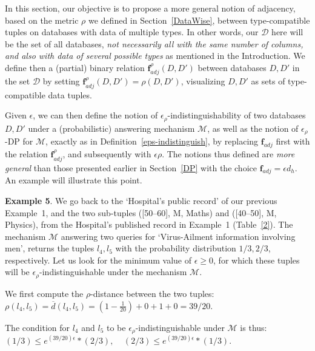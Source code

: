 \documentclass[pdflatex]{article}
\def \D {{\mathcal{D}}}
\def \M {{\mathcal{M}}}
\def \lft {\noindent}
\def \ovr {\overline}
\newcommand{\brho}{\mathbf{f}}
\begin{document}
  In this section, our objective is to propose a more general notion of adjacency,
  based  on  the  metric $\rho$ we defined in Section~\ref{DataWise}, between
  type-compatible tuples on databases   with   data of multiple types.
  In other words, our $\D$ here will be  the set of all   databases, {\em not necessarily
    all with the same number of columns, and also with data of   several possible types}
  as mentioned in the Introduction. We define then  a (partial) binary   relation
  $\brho^{\rho}_{adj}(D, D')$ between databases $D, D'$ in the set  $\D$ by 
  setting $ \brho^{\rho}_{adj}(D, D') = \rho(D, D')$, visualizing  $D, D'$  as  sets of
  type-compatible data tuples. 
 
  Given $\epsilon$, we can then define the notion of $\epsilon_{\rho}$-indistinguishability
  of   two  databases $D, D'$ under a (probabilistic) answering mechanism $\M$, as well as
  the  notion of $\epsilon_{\rho}$-DP for $\M$, exactly as in
  Definition~\ref{eps-indistinguish},
  by   replacing   $\brho_{adj}$ first with the relation $ \brho^{\rho}_{adj}$,  and
  subsequently with   $\epsilon\rho$. The notions thus defined are {\em more general} than 
  those presented   earlier in  Section~\ref{DP} with the choice  $\brho_{adj} = \epsilon  d_h$.
 An example will illustrate this point.  
  
  \vspace*{1mm}\lft
  {\bf Example 5}. We go back  to  the `Hospital's public record' of our  previous
  Example~1, and the two sub-tuples ([50--60], M, Maths) and   ([40--50], M, Physics),
  from  the Hospital's  published record in Example~1  (Table~\ref{2}). The  mechanism
  $\M$ answering two queries for `Virus-Ailment   information involving men', returns
  the tuples  $l_4, l_5$ with the  probability distribution $1/3, 2/3$, respectively.
Let us  look for the minimum value of $\epsilon \ge 0$, for which these tuples
 will be $\epsilon_{\rho}$-indistinguishable under the mechanism $\M$.

 We first compute the  $\rho$-distance between the two tuples: \\ \hspace*{2cm}
 $\rho(l_4, l_5) =  \ovr{d}(l_4, l_5) = (1 - \frac{1}{20}) + 0 + 1 + 0 = 39/20$.
 
  The condition   for $l_4$ and  $l_5$ to be $\epsilon_{\rho}$-indistinguishable
  under $\M$ is thus: \\ \hspace*{2cm}
    $ (1/3 ) \le e^{(39/20) \epsilon}*(2/3),  \;\; \;\;  (2/3) \le  e^{(39/20)\epsilon}*(1/3)$. 
\end{document}

